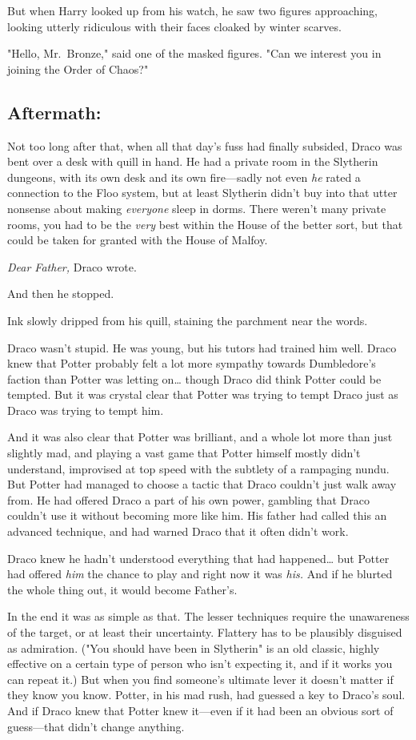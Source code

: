 But when Harry looked up from his watch, he saw two figures approaching, 
looking utterly ridiculous with their faces cloaked by winter scarves.

"Hello, Mr.~Bronze," said one of the masked figures. "Can we interest you in 
joining the Order of Chaos?"
\sbreak
\subsection{Aftermath:}

Not too long after that, when all that day's fuss had finally subsided, Draco 
was bent over a desk with quill in hand. He had a private room in the Slytherin 
dungeons, with its own desk and its own fire---sadly not even \emph{he} rated a 
connection to the Floo system, but at least Slytherin didn't buy into that 
utter nonsense about making \emph{everyone} sleep in dorms. There weren't many 
private rooms, you had to be the \emph{very} best within the House of the 
better sort, but that could be taken for granted with the House of Malfoy.

\emph{Dear Father,} Draco wrote.

And then he stopped.

Ink slowly dripped from his quill, staining the parchment near the words.

Draco wasn't stupid. He was young, but his tutors had trained him well. Draco 
knew that Potter probably felt a lot more sympathy towards Dumbledore's faction 
than Potter was letting on{\ldots} though Draco did think Potter could be 
tempted. But it was crystal clear that Potter was trying to tempt Draco just as 
Draco was trying to tempt him.

And it was also clear that Potter was brilliant, and a whole lot more than just 
slightly mad, and playing a vast game that Potter himself mostly didn't 
understand, improvised at top speed with the subtlety of a rampaging nundu. But 
Potter had managed to choose a tactic that Draco couldn't just walk away from. 
He had offered Draco a part of his own power, gambling that Draco couldn't use 
it without becoming more like him. His father had called this an advanced 
technique, and had warned Draco that it often didn't work.

Draco knew he hadn't understood everything that had happened{\ldots} but Potter 
had offered \emph{him} the chance to play and right now it was \emph{his.} And 
if he blurted the whole thing out, it would become Father's.

In the end it was as simple as that. The lesser techniques require the 
unawareness of the target, or at least their uncertainty. Flattery has to be 
plausibly disguised as admiration. ("You should have been in Slytherin" is an 
old classic, highly effective on a certain type of person who isn't expecting 
it, and if it works you can repeat it.) But when you find someone's ultimate 
lever it doesn't matter if they know you know. Potter, in his mad rush, had 
guessed a key to Draco's soul. And if Draco knew that Potter knew it---even if 
it had been an obvious sort of guess---that didn't change anything.

